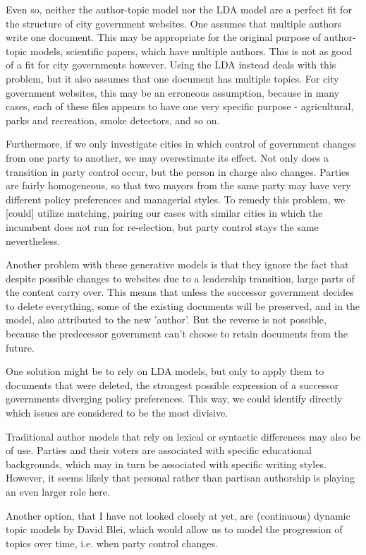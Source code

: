 \documentclass[11pt]{article}
\begin{document}
Even so, neither the author-topic model nor the LDA model are a perfect fit for the structure of city government websites. One assumes that multiple authors write one document. This may be appropriate for the original purpose of author-topic models, scientific papers, which have multiple authors. This is not as good of a fit for city governments however. Using the LDA instead deals with this problem, but it also assumes that one document has multiple topics. For city government websites, this may be an erroneous assumption, because in many cases, each of these files appears to have one very specific purpose - agricultural, parks and recreation, smoke detectors, and so on.

Furthermore, if we only investigate cities in which control of government changes from one party to another, we may overestimate its effect. Not only does a transition in party control occur, but the person in charge also changes. Parties are fairly homogeneous, so that two mayors from the same party may have very different policy preferences and managerial styles. To remedy this problem, we [could] utilize matching, pairing our cases with similar cities in which the incumbent does not run for re-election, but party control stays the same nevertheless.

Another problem with these generative models is that they ignore the fact that despite possible changes to websites due to a leadership transition, large parts of the content carry over. This means that unless the successor government decides to delete everything, some of the existing documents will be preserved, and in the model, also attributed to the new 'author'. But the reverse is not possible, because the predecessor government can't choose to retain documents from the future.

One solution might be to rely on LDA models, but only to apply them to documents that were deleted, the strongest possible expression of a successor governments diverging policy preferences. This way, we could identify directly which issues are considered to be the most divisive.

Traditional author models that rely on lexical or syntactic differences may also be of use. Parties and their voters are associated with specific educational backgrounds, which may in turn be associated with specific writing styles. However, it seems likely that personal rather than partisan authorship is playing an even larger role here.

Another option, that I have not looked closely at yet, are (continuous) dynamic topic models by David Blei, which would allow us to model the progression of topics over time, i.e. when party control changes.


\newpage



\end{document}
